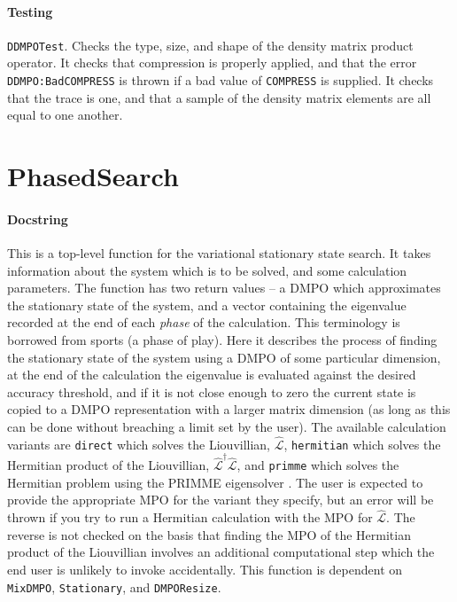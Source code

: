  \paragraph{Testing} \lstinline$DDMPOTest$. Checks the type, size, and shape of the density matrix product operator. It checks that compression is properly applied, and that the error \lstinline$DDMPO:BadCOMPRESS$ is thrown if a bad value of \lstinline$COMPRESS$ is supplied. It checks that the trace is one, and that a sample of the density matrix elements are all equal to one another.

 \section{PhasedSearch}
 \paragraph{Docstring} This is a top-level function for the variational stationary state search. It takes information about the system which is to be solved, and some calculation parameters. The function has two return values -- a DMPO which approximates the stationary state of the system, and a vector containing the eigenvalue recorded at the end of each \emph{phase} of the calculation. This terminology is borrowed from sports (a phase of play). Here it describes the process of finding the stationary state of the system using a DMPO of some particular dimension, at the end of the calculation the eigenvalue is evaluated against the desired accuracy threshold, and if it is not close enough to zero the current state is copied to a DMPO representation with a larger matrix dimension (as long as this can be done without breaching a limit set by the user). The available calculation variants are \lstinline$direct$ which solves the Liouvillian, \(\hat{\mathcal{L}}\), \lstinline$hermitian$ which solves the Hermitian product of the Liouvillian, \(\hat{\mathcal{L}}^{\dagger}\hat{\mathcal{L}}\), and \lstinline$primme$ which solves the Hermitian problem using the PRIMME eigensolver \cite{Stathopoulos2010,Wu2017}. The user is expected to provide the appropriate MPO for the variant they specify, but an error will be thrown if you try to run a Hermitian calculation with the MPO for \(\hat{\mathcal{L}}\). The reverse is not checked on the basis that finding the MPO of the Hermitian product of the Liouvillian involves an additional computational step which the end user is unlikely to invoke accidentally. This function is dependent on \lstinline$MixDMPO$, \lstinline$Stationary$, and \lstinline$DMPOResize$.
